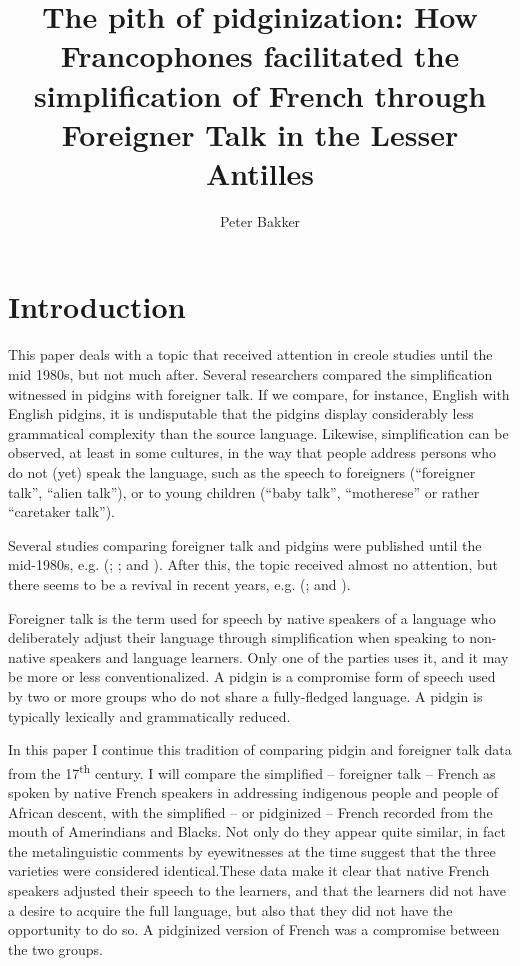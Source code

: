 \documentclass[output=paper,colorlinks,citecolor=brown]{langscibook}
\author{Peter Bakker\affiliation{Aarhus University}}
\title[The pith of pidginization]{The pith of pidginization: How Francophones facilitated the simplification of French  through Foreigner Talk  in the Lesser Antilles}
\begin{document}
\maketitle
\section{Introduction} \label{sec:bakker:1}
 
This paper deals with a topic that received attention in creole studies until the mid 1980s, but not much after. Several researchers compared the simplification witnessed in pidgins with foreigner talk. If we compare, for instance, English with English pidgins, it is undisputable that the pidgins display considerably less grammatical complexity than the source language. Likewise, simplification can be observed, at least in some cultures, in the way that people address persons who do not (yet) speak the language, such as the speech to foreigners (“foreigner talk”, “alien talk”), or to young children (“baby talk”, “motherese” or rather “caretaker talk”).

Several studies comparing foreigner talk and pidgins were published until the mid-1980s, e.g. (\cite{Ferguson1971}; \cite{Meisel1975,Meisel1977}; \cite{harding1984} and \cite{Hinnenkamp1984}). After this, the topic received almost no attention, but there seems to be a revival in recent years, e.g. (\citet{Fedorova2006};  \citet{Versteegh2014} and \citet{Avram2017}).
 
Foreigner talk is the term used for speech by native speakers of a language who deliberately adjust their language through simplification when speaking to non-native speakers and language learners. Only one of the parties uses it, and it may be more or less conventionalized. A pidgin is a compromise form of speech used by two or more groups who do not share a fully-fledged language. A pidgin is typically lexically and grammatically reduced.

In this paper I continue this tradition of comparing pidgin and foreigner talk data from the 17\textsuperscript{th} century. I will compare the simplified – foreigner talk – French as spoken by native French speakers in addressing indigenous people and people of African descent, with the simplified – or pidginized – French recorded from the mouth of Amerindians and Blacks. Not only do they appear quite similar, in fact the metalinguistic comments by eyewitnesses at the time suggest that the three varieties were considered identical.These data make it clear that native French speakers adjusted their speech to the learners, and that the learners did not have a desire to acquire the full language, but also that they did not have the opportunity to do so. A pidginized version of French was a compromise between the two groups.
 
\end{document}
